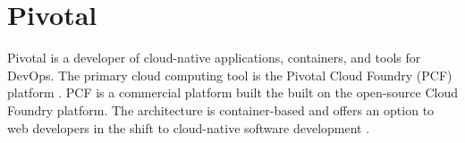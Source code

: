 \section{Pivotal}

Pivotal is a developer of cloud-native applications, 
containers, and tools for DevOps. The primary cloud 
computing tool is the Pivotal Cloud Foundry (PCF) 
platform \cite{hid-sp18-404-Pivotal2017}. PCF is a 
commercial platform built the built on the open-source 
Cloud Foundry platform. The architecture is container-based 
and offers an option to web developers in the shift to 
cloud-native software development \cite{hid-sp18-404-Darrow2016}. 
